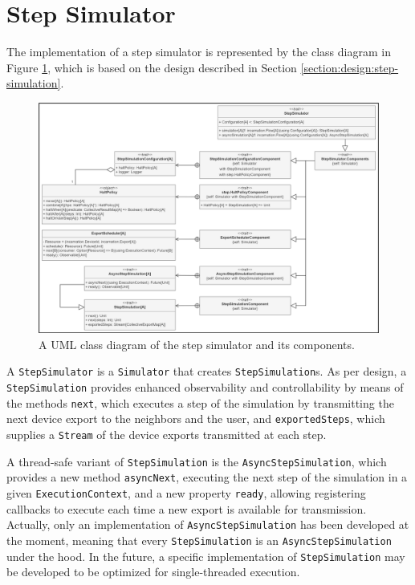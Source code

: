 
\section{Step Simulator}
\label{section:implementation:step-simulator}

The implementation of a step simulator is represented by the class diagram in
Figure \ref{figure:step-simulator-class-diagram}, which is based on the design
described in Section \ref{section:design:step-simulation}.

\begin{figure}[!ht]
  \centering
  \includegraphics[width=1\textwidth]{resources/figures/step-simulator-class-diagram.png}
  \caption[A UML class diagram of the step simulator]{
    A UML class diagram of the step simulator and its components.
  }
  \label{figure:step-simulator-class-diagram}
\end{figure}

A \texttt{StepSimulator} is a \texttt{Simulator} that creates
\texttt{StepSimulation}s. As per design, a \texttt{StepSimulation} provides
enhanced observability and controllability by means of the methods
\texttt{next}, which executes a step of the simulation by transmitting the next
device export to the neighbors and the user, and \texttt{exportedSteps}, which
supplies a \texttt{Stream} of the device exports transmitted at each step.

A thread-safe variant of \texttt{StepSimulation} is the
\texttt{AsyncStepSimulation}, which provides a new method \texttt{asyncNext},
executing the next step of the simulation in a given \texttt{ExecutionContext},
and a new property \texttt{ready}, allowing registering callbacks to execute
each time a new export is available for transmission. Actually, only an
implementation of \texttt{AsyncStepSimulation} has been developed at the
moment, meaning that every \texttt{StepSimulation} is an
\texttt{AsyncStepSimulation} under the hood. In the future, a specific
implementation of \texttt{StepSimulation} may be developed to be optimized for
single-threaded execution.

